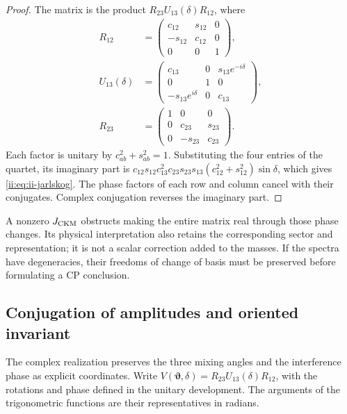 \begin{proof}
The matrix is the product \(R_{23}U_{13}(\delta)R_{12}\), where
\begin{equation}
\begin{aligned}
 R_{12}&=\begin{pmatrix}c_{12}&s_{12}&0\\-s_{12}&c_{12}&0\\0&0&1\end{pmatrix},
 \\
 U_{13}(\delta)&=
 \begin{pmatrix}c_{13}&0&s_{13}e^{-i\delta}\\0&1&0\\
 -s_{13}e^{i\delta}&0&c_{13}\end{pmatrix},
 \\
 R_{23}&=\begin{pmatrix}1&0&0\\0&c_{23}&s_{23}\\0&-s_{23}&c_{23}\end{pmatrix}.
\end{aligned}
 \label{ii:eq:ii-ckm-factorization}
\end{equation}
Each factor is unitary by \(c_{ab}^2+s_{ab}^2=1\). Substituting the four entries of the quartet, its imaginary part is \(c_{12}s_{12}c_{13}^2c_{23}s_{23}s_{13}
(c_{12}^2+s_{12}^2)\sin\delta\), which gives \eqref{ii:eq:ii-jarlskog}. The phase factors of each row and column cancel with their conjugates. Complex conjugation reverses the imaginary part.
\end{proof}

A nonzero \(J_{\rm CKM}\) obstructs making the entire matrix real through those phase changes. Its physical interpretation also retains the corresponding sector and representation; it is not a scalar correction added to the masses. If the spectra have degeneracies, their freedoms of change of basis must be preserved before formulating a CP conclusion.


\subsection{Conjugation of amplitudes and oriented invariant}
\label{ii:sec:ii09-conjugacion-amplitudes}

The complex realization preserves the three mixing angles and
the interference phase as explicit coordinates. Write
\(V(\boldsymbol\vartheta,\delta)
=R_{23}U_{13}(\delta)R_{12}\), with the rotations and phase
defined in the unitary development. The arguments of the
trigonometric functions are their representatives in radians.


